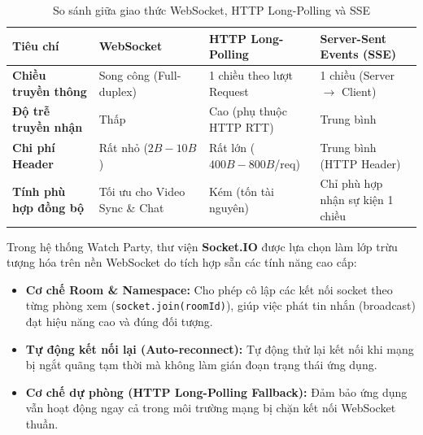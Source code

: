 \documentclass[12pt,a4paper]{extarticle}
\begin{document}
\begin{table}[H]
\centering
\small
\caption{So sánh giữa giao thức WebSocket, HTTP Long-Polling và SSE}
\label{tab:protocol_comparison}
\begin{tabular}{|p{3.2cm}|p{3.8cm}|p{3.8cm}|p{3.8cm}|}
\hline
\textbf{Tiêu chí} & \textbf{WebSocket} & \textbf{HTTP Long-Polling} & \textbf{Server-Sent Events (SSE)} \\ \hline
\textbf{Chiều truyền thông} & Song công (Full-duplex) & 1 chiều theo lượt Request & 1 chiều (Server $\rightarrow$ Client) \\ \hline
\textbf{Độ trễ truyền nhận} & Thấp & Cao (phụ thuộc HTTP RTT) & Trung bình \\ \hline
\textbf{Chi phí Header} & Rất nhỏ ($2B - 10B$) & Rất lớn ($400B - 800B$/req) & Trung bình (HTTP Header) \\ \hline
\textbf{Tính phù hợp đồng bộ} & Tối ưu cho Video Sync \& Chat & Kém (tốn tài nguyên) & Chỉ phù hợp nhận sự kiện 1 chiều \\ \hline
\end{tabular}
\end{table}

Trong hệ thống Watch Party, thư viện \textbf{Socket.IO} được lựa chọn làm lớp trừu tượng hóa trên nền WebSocket do tích hợp sẵn các tính năng cao cấp:
\begin{itemize}[leftmargin=1.2cm]
    \item \textbf{Cơ chế Room \& Namespace:} Cho phép cô lập các kết nối socket theo từng phòng xem (\texttt{socket.join(roomId)}), giúp việc phát tin nhắn (broadcast) đạt hiệu năng cao và đúng đối tượng.
    \item \textbf{Tự động kết nối lại (Auto-reconnect):} Tự động thử lại kết nối khi mạng bị ngắt quãng tạm thời mà không làm gián đoạn trạng thái ứng dụng.
    \item \textbf{Cơ chế dự phòng (HTTP Long-Polling Fallback):} Đảm bảo ứng dụng vẫn hoạt động ngay cả trong môi trường mạng bị chặn kết nối WebSocket thuần.
\end{itemize}
\end{document}
